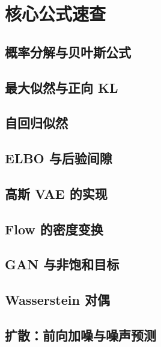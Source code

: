 \chapter{核心公式速查}
\label{chap:formulas}

\section{概率分解与贝叶斯公式}
\label{sec:formulas-probability}
\contentplaceholder

\section{最大似然与正向 KL}
\label{sec:formulas-mle}
\contentplaceholder

\section{自回归似然}
\label{sec:formulas-autoregressive}
\contentplaceholder

\section{ELBO 与后验间隙}
\label{sec:formulas-elbo}
\contentplaceholder

\section{高斯 VAE 的实现}
\label{sec:formulas-gaussian-vae}
\contentplaceholder

\section{Flow 的密度变换}
\label{sec:formulas-flow}
\contentplaceholder

\section{GAN 与非饱和目标}
\label{sec:formulas-gan}
\contentplaceholder

\section{Wasserstein 对偶}
\label{sec:formulas-wasserstein}
\contentplaceholder

\section{扩散：前向加噪与噪声预测}
\label{sec:formulas-diffusion}
\contentplaceholder
